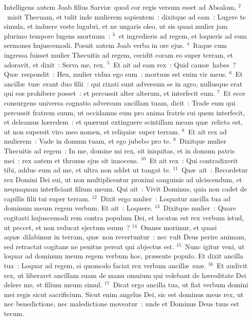 \lettrine[lines=3,image=true,loversize=0.05,lraise=-0.03]{I}{}ntelligens autem Joab filius Sarvi\ae\ quod cor regis versum esset ad Absalom,
${}^{2}$~misit Thecuam, et tulit inde mulierem sapientem~: dixitque ad eam~: Lugere te simula, et induere veste lugubri, et ne ungaris oleo, ut sis quasi mulier jam plurimo tempore lugens mortuum~:
${}^{3}$~et ingredieris ad regem, et loqueris ad eum sermones hujuscemodi. Posuit autem Joab verba in ore ejus.
${}^{4}$~Itaque cum ingressa fuisset mulier Thecuitis ad regem, cecidit coram eo super terram, et adoravit, et dixit~: Serva me, rex.
${}^{5}$~Et ait ad eam rex~: Quid caus\ae\ habes~? Qu\ae\ respondit~: Heu, mulier vidua ego sum~: mortuus est enim vir meus.
${}^{6}$~Et ancill\ae\ tu\ae\ erant duo filii~: qui rixati sunt adversum se in agro, nullusque erat qui eos prohibere posset~: et percussit alter alterum, et interfecit eum.
${}^{7}$~Et ecce consurgens universa cognatio adversum ancillam tuam, dicit~: Trade eum qui percussit fratrem suum, ut occidamus eum pro anima fratris sui quem interfecit, et deleamus h\ae redem~: et qu\ae runt extinguere scintillam meam qu\ae\ relicta est, ut non supersit viro meo nomen, et reliqui\ae\ super terram.
${}^{8}$~Et ait rex ad mulierem~: Vade in domum tuam, et ego jubebo pro te.
${}^{9}$~Dixitque mulier Thecuitis ad regem~: In me, domine mi rex, sit iniquitas, et in domum patris mei~: rex autem et thronus ejus sit innocens.
${}^{10}$~Et ait rex~: Qui contradixerit tibi, adduc eum ad me, et ultra non addet ut tangat te.
${}^{11}$~Qu\ae\ ait~: Recordetur rex Domini Dei sui, ut non multiplicentur proximi sanguinis ad ulciscendum, et nequaquam interficiant filium meum. Qui ait~: Vivit Dominus, quia non cadet de capillis filii tui super terram.
${}^{12}$~Dixit ergo mulier~: Loquatur ancilla tua ad dominum meum regem verbum. Et ait~: Loquere.
${}^{13}$~Dixitque mulier~: Quare cogitasti hujuscemodi rem contra populum Dei, et locutus est rex verbum istud, ut peccet, et non reducat ejectum suum~?
${}^{14}$~Omnes morimur, et quasi aqu\ae\ dilabimur in terram, qu\ae\ non revertuntur~: nec vult Deus perire animam, sed retractat cogitans ne penitus pereat qui abjectus est.
${}^{15}$~Nunc igitur veni, ut loquar ad dominum meum regem verbum hoc, pr\ae sente populo. Et dixit ancilla tua~: Loquar ad regem, si quomodo faciat rex verbum ancill\ae\ su\ae .
${}^{16}$~Et audivit rex, ut liberaret ancillam suam de manu omnium qui volebant de h\ae reditate Dei delere me, et filium meum simul.
${}^{17}$~Dicat ergo ancilla tua, ut fiat verbum domini mei regis sicut sacrificium. Sicut enim angelus Dei, sic est dominus meus rex, ut nec benedictione, nec maledictione moveatur~: unde et Dominus Deus tuus est tecum.
